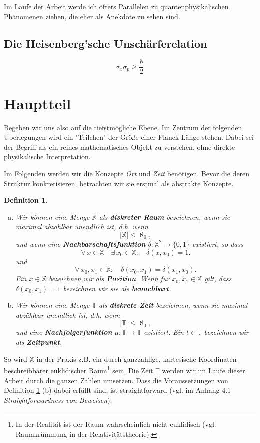 \documentclass[a4paper,12pt,ngerman]{scrartcl}
\theoremstyle{plain}
\newtheorem{definition}{Definition}
\theoremstyle{plain}
\newcommand{\T}{\mathbb{T}}
\newcommand{\X}{\mathbb{X}}
\begin{document}
Im Laufe der Arbeit werde ich öfters Parallelen zu quantenphysikalischen Phänomenen ziehen, die eher als Anekdote zu sehen sind. %

\subsection{Die Heisenberg'sche Unschärferelation}


\[\sigma_x \sigma_p \geq \frac{\hbar}{2}\]

\section{Hauptteil}

Begeben wir uns also auf die tiefstmögliche Ebene. Im Zentrum der folgenden Überlegungen wird ein "Teilchen" der Größe einer Planck-Länge stehen. Dabei sei der Begriff als ein reines mathematisches Objekt zu verstehen, ohne direkte physikalische Interpretation.

Im Folgenden werden wir die Konzepte \textit{Ort} und \textit{Zeit} benötigen. Bevor die deren Struktur konkretisieren, betrachten wir sie erstmal als abstrakte Konzepte.

\begin{definition}\label{def_ortundzeit}
\begin{enumerate}[(a)]
\item Wir können eine Menge $\X$ als \textbf{diskreter Raum} bezeichnen, wenn sie maximal abzählbar unendlich ist, d.h. wenn
\[ |\X| \leq \aleph_0,\]
und wenn eine \textbf{Nachbarschaftsfunktion} $\delta: \X^2\rightarrow\{0,1\}$ existiert, so dass
\[\forall\, x\in\X\quad\exists\, x_0\in\X: \quad\delta(x,x_0)=1.\]
und
\[\forall\, x_0,x_1\in\X: \quad\delta(x_0,x_1)=\delta(x_1,x_0).\]
Ein $x\in\X$ bezeichnen wir als \textbf{Position}. Wenn für $x_0,x_1\in\X$ gilt, dass $\delta(x_0,x_1)=1$ bezeichnen wir sie als \textbf{benachbart}. 
\item Wir können eine Menge $\T$ als \textbf{diskrete Zeit} bezeichnen, wenn sie maximal abzählbar unendlich ist, d.h. wenn
\[ |\T| \leq \aleph_0,\]
und eine \textbf{Nachfolgerfunktion} $\mu: \T \rightarrow \T$ existiert. Ein $t\in\T$ bezeichnen wir als \textbf{Zeitpunkt}.
\end{enumerate}
\end{definition} %

So wird $\X$ in der Praxis z.B. ein durch ganzzahlige, kartesische Koordinaten beschreibbarer euklidischer Raum\footnote{In der Realität ist der Raum wahrscheinlich nicht euklidisch (vgl. Raumkrümmung in der Relativitätstheorie).} sein. Die Zeit $\T$ werden wir im Laufe dieser Arbeit durch die ganzen Zahlen umsetzen. Dass die Voraussetzungen von Definition \ref{def_ortundzeit} (b) dabei erfüllt sind, ist straightforward (vgl. im Anhang 4.1 \textit{Straightforwardness von Beweisen}).
\end{document}
